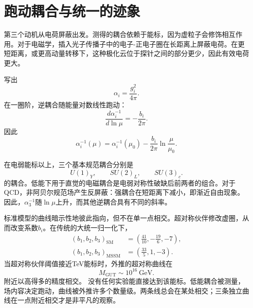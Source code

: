 \section{跑动耦合与统一的迹象}

第三个动机从电荷屏蔽出发。测得的耦合依赖于能标，因为虚粒子会修饰相互作用。对于电磁学，插入光子传播子中的电子-正电子圈在长距离上屏蔽电荷。在更短距离，或更高动量转移下，这种极化云位于探针之间的部分更少，因此有效电荷更大。

写出
\begin{equation}
\alpha_i=\frac{g_i^2}{4\pi}.
\end{equation}
在一圈阶，逆耦合随能量对数线性跑动：
\begin{equation}
\frac{d\alpha_i^{-1}}{d\ln\mu}
=-\frac{b_i}{2\pi}.
\end{equation}
因此
\begin{equation}
\alpha_i^{-1}(\mu)
=\alpha_i^{-1}(\mu_0)
-\frac{b_i}{2\pi}\ln\frac{\mu}{\mu_0}.
\end{equation}

在电弱能标以上，三个基本规范耦合分别是
\begin{equation}
U(1)_Y,\qquad SU(2)_L,\qquad SU(3)_c.
\end{equation}
的耦合。低能下用于直觉的电磁耦合是电弱对称性破缺后前两者的组合。对于QCD，非阿贝尔规范场产生反屏蔽：强耦合在短距离下减小，即渐近自由现象。因此，\(\alpha_3^{-1}\)随\(\ln\mu\)上升，而其他逆耦合具有不同的斜率。

标准模型的曲线暗示性地彼此指向，但不在单一点相交。超对称伙伴修改虚圈，从而改变系数\(b_i\)。在传统的大统一归一化下，
\begin{align}
(b_1,b_2,b_3)_{\mathrm{SM}}
&=\left(\frac{41}{10},-\frac{19}{6},-7\right),\\
(b_1,b_2,b_3)_{\mathrm{MSSM}}
&=\left(\frac{33}{5},1,-3\right).
\end{align}
当超对称伙伴阈值接近TeV能标时，外推的超对称曲线在
\begin{equation}
M_{\mathrm{GUT}}\sim 10^{16}\ \mathrm{GeV}.
\end{equation}
附近以高得多的精度相交。
没有任何实验能直接达到该能标。低能耦合被测量，场内容决定跑动，曲线被外推许多个数量级。两条线总会在某处相交；三条独立曲线在一点附近相交才是非平凡的观察。

\begin{classroomqa}
\end{classroomqa}

